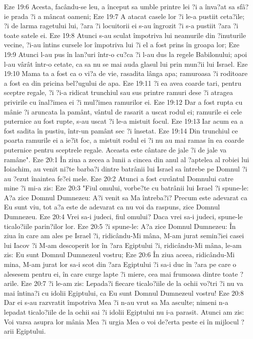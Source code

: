 Eze 19:6  Acesta, facându-se leu, a început sa umble printre lei ?i a înva?at sa sfâ?ie prada ?i a mâncat oameni;
Eze 19:7  A atacat casele lor ?i le-a pustiit ceta?ile; ?i de larma ragetului lui, ?ara ?i locuitorii ei s-au îngrozit ?i s-a pustiit ?ara ?i toate satele ei.
Eze 19:8  Atunci s-au sculat împotriva lui neamurile din ?inuturile vecine, ?i-au întins cursele lor împotriva lui ?i el a fost prins în groapa lor;
Eze 19:9  Atunci l-au pus în lan?uri într-o cu?ca ?i l-au dus la regele Babilonului; apoi l-au vârât într-o cetate, ca sa nu se mai auda glasul lui prin mun?ii lui Israel.
Eze 19:10  Mama ta a fost ca o vi?a de vie, rasadita lânga apa; ramuroasa ?i roditoare a fost ea din pricina bel?ugului de apa.
Eze 19:11  ?i ea avea coarde tari, pentru sceptre regale, ?i ?i-a ridicat trunchiul sau sus printre ramuri dese ?i atragea privirile cu înal?imea ei ?i mul?imea ramurilor ei.
Eze 19:12  Dar a fost rupta cu mânie ?i aruncata la pamânt, vântul de rasarit a uscat rodul ei; ramurile ei cele puternice au fost rupte, s-au uscat ?i le-a mistuit focul.
Eze 19:13  Iar acum ea a fost sadita în pustiu, într-un pamânt sec ?i însetat.
Eze 19:14  Din trunchiul ce poarta ramurile ei a ie?it foc, a mistuit rodul ei ?i nu au mai ramas în ea coarde puternice pentru sceptrele regale. Aceasta este cântare de jale ?i de jale va ramâne".
Eze 20:1  În ziua a zecea a lunii a cincea din anul al ?aptelea al robiei lui Ioiachim, au venit ni?te barba?i dintre batrânii lui Israel sa întrebe pe Domnul ?i au ?ezut înaintea fe?ei mele.
Eze 20:2  Atunci a fost cuvântul Domnului catre mine ?i mi-a zis:
Eze 20:3  "Fiul omului, vorbe?te cu batrânii lui Israel ?i spune-le: A?a zice Domnul Dumnezeu: A?i venit sa Ma întreba?i? Precum este adevarat ca Eu sunt viu, tot a?a este de adevarat ca nu voi da raspuns, zice Domnul Dumnezeu.
Eze 20:4  Vrei sa-i judeci, fiul omului? Daca vrei sa-i judeci, spune-le ticalo?iile parin?ilor lor.
Eze 20:5  ?i spune-le: A?a zice Domnul Dumnezeu: În ziua în care am ales pe Israel ?i, ridicându-Mi mâna, M-am jurat semin?iei casei lui Iacov ?i M-am descoperit lor în ?ara Egiptului ?i, ridicându-Mi mâna, le-am zis: Eu sunt Domnul Dumnezeul vostru;
Eze 20:6  În ziua aceea, ridicându-Mi mina, M-am jurat lor sa-i scot din ?ara Egiptului ?i sa-i duc în ?ara pe care o alesesem pentru ei, în care curge lapte ?i miere, cea mai frumoasa dintre toate ?arile.
Eze 20:7  ?i le-am zis: Lepada?i fiecare ticalo?iile de la ochii vo?tri ?i nu va mai întina?i cu idolii Egiptului, ca Eu sunt Domnul Dumnezeul vostru!
Eze 20:8  Dar ei s-au razvratit împotriva Mea ?i n-au vrut sa Ma asculte; nimeni n-a lepadat ticalo?iile de la ochii sai ?i idolii Egiptului nu i-a parasit. Atunci am zis: Voi varsa asupra lor mânia Mea ?i urgia Mea o voi de?erta peste ei în mijlocul ?arii Egiptului.
